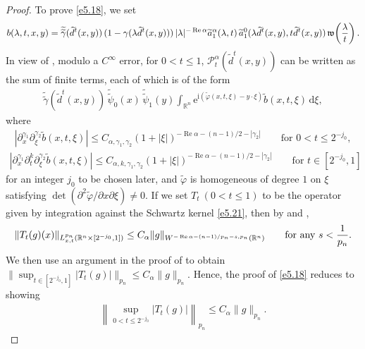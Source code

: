 \documentclass[11pt]{amsproc}
\newcommand{\R}{\mathbb{R}}
\newcommand{\e}{\mathrm{e}}
\newcommand{\0}{\mathbf{0}}
\newcommand{\fc}{\mathfrak{w}}
\renewcommand{\Re}{\mathop{\mathrm{Re}}}
\renewcommand{\i}{\mathrm{i}}
\renewcommand{\d}{\mathrm{d}}
\numberwithin{equation}{section}
\numberwithin{figure}{section}
\theoremstyle{definition}
\theoremstyle{remark}
\numberwithin{thm}{section}
\begin{document}
\begin{proof}
To prove \eqref{e5.18},  we set
\begin{eqnarray*}
b(\lambda,t,x,y)=\widetilde{\widetilde{\gamma}}(\widetilde{d}^t(x,y))\,(1-\gamma(\lambda \widetilde{d}^t(x,y)))\,|\lambda|^{-\Re\alpha}\widetilde{a}^\alpha_1(\lambda,t)\,\widetilde{a}^0_1(\lambda \widetilde{d}^t(x,y),t\widetilde{d}^t(x,y))\,\fc\!\left({\lambda\over t}\right).
\end{eqnarray*}
In view of \cite[Proposition 6.2.4]{So1}, modulo a $C^\infty$ error, for $0<t\leq1$, $\mathscr{P}^\alpha_t(\widetilde{d}^t(x,y))$ can be written as the sum of %
finite
terms, each of which is of the form
\begin{eqnarray}\label{e5.21}
\widetilde{\widetilde{\gamma}}(\widetilde{d}^t(x,y))\,\widetilde{\widetilde{\psi}}_0(x)\,\widetilde{\widetilde{\psi}}_1(y)\int_{\R^n}\e^{\i(\widetilde{\varphi}(x,t,\xi)-y\cdot\xi)}\widetilde{b}(x,t,\xi)\,\d\xi,
\end{eqnarray}
where   
\begin{eqnarray*}
|\partial^{\gamma_1}_x\partial^{\gamma_2}_\xi\widetilde{b}(x,t,\xi)|\leq C_{\alpha,\gamma_1,\gamma_2}(1+|\xi|)^{-\Re\alpha-(n-1)/2-|\gamma_2|}\qquad\mbox{for }0<t\leq 2^{-j_0},
\end{eqnarray*}
\begin{eqnarray*}
|\partial^{\gamma_1}_x\partial^k_t\partial^{\gamma_2}_\xi\widetilde{b}(x,t,\xi)|\leq C_{\alpha,k,\gamma_1,\gamma_2}(1+|\xi|)^{-\Re\alpha-(n-1)/2-|\gamma_2|}\qquad\mbox{for }t\in [2^{-j_0},1] 
\end{eqnarray*}
for an integer $j_0$ 
to be
chosen later, and  $\widetilde{\varphi}$ is homogeneous of degree $1$ on $\xi$ satisfying $\det({\partial^2\widetilde{\varphi}/\partial x\partial\xi})\ne 0$. If we set $T_t\ (0<t\leq 1)$ to be the operator given by integration against the Schwartz kernel \eqref{e5.21}, then by \cite[Proposition 3.2]{BeHiSo} and \cite[Theorem 1.4]{GaLiMiXi},
\begin{eqnarray*}
\|T_t(g)(x)\|_{L^{p_n}_{x,t}(\R^n\times[2^{-j_0},1])}\leq C_\alpha\|g\|_{W^{-\Re\alpha-(n-1)/p_n-s,p_n}(\R^n)}\qquad\mbox{for any }s<{1\over p_n}.
\end{eqnarray*}
We then use an argument in 
the proof of 
\cite[Theorem 6.3.1]{So1} to obtain
$
\|\sup_{t\in[2^{-j_0},1]}|T_t(g)|\|_{p_n}\leq C_\alpha \|g\|_{p_n}.
$
Hence,  the proof of  \eqref{e5.18} reduces to 
showing 
\begin{eqnarray}\label{e5.23}
\left\|\sup_{0<t\leq 2^{-j_0}}|T_t(g)|\right\|_{p_n}\leq C_\alpha \|g\|_{p_n}.
\end{eqnarray}

\end{proof}
\end{document}
